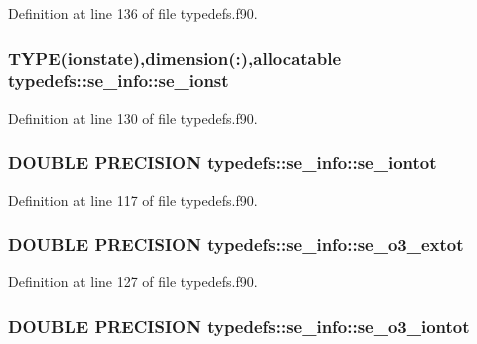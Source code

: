 Definition at line 136 of file typedefs.f90.\hypertarget{typetypedefs_1_1se__info_a791773634dc97c66c0792489bc139f4a}{
\subsubsection[{se\_\-ionst}]{\setlength{\rightskip}{0pt plus 5cm}TYPE({\bf ionstate}),dimension(:),allocatable {\bf typedefs::se\_\-info::se\_\-ionst}}}
\label{typetypedefs_1_1se__info_a791773634dc97c66c0792489bc139f4a}


Definition at line 130 of file typedefs.f90.\hypertarget{typetypedefs_1_1se__info_a03b3420231fce0a9fdd58f4579b45700}{
\subsubsection[{se\_\-iontot}]{\setlength{\rightskip}{0pt plus 5cm}DOUBLE PRECISION {\bf typedefs::se\_\-info::se\_\-iontot}}}
\label{typetypedefs_1_1se__info_a03b3420231fce0a9fdd58f4579b45700}


Definition at line 117 of file typedefs.f90.\hypertarget{typetypedefs_1_1se__info_ae366af38541d327018e02f7c121d2fed}{
\subsubsection[{se\_\-o3\_\-extot}]{\setlength{\rightskip}{0pt plus 5cm}DOUBLE PRECISION {\bf typedefs::se\_\-info::se\_\-o3\_\-extot}}}
\label{typetypedefs_1_1se__info_ae366af38541d327018e02f7c121d2fed}


Definition at line 127 of file typedefs.f90.\hypertarget{typetypedefs_1_1se__info_aae367a6217e2ba4848d64c1f37b692d2}{
\subsubsection[{se\_\-o3\_\-iontot}]{\setlength{\rightskip}{0pt plus 5cm}DOUBLE PRECISION {\bf typedefs::se\_\-info::se\_\-o3\_\-iontot}}}
\label{typetypedefs_1_1se__info_aae367a6217e2ba4848d64c1f37b692d2}


